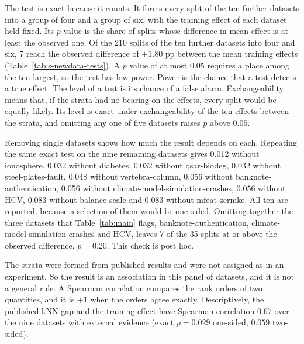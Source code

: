 The test is exact because it counts. It forms every split of the ten further datasets into a group of four and a group of six, with the training effect of each dataset held fixed. Its $p$ value is the share of splits whose difference in mean effect is at least the observed one. Of the 210 splits of the ten further datasets into four and six, 7 reach the observed difference of $+1.80$ pp between the mean training effects (Table~\ref{tab:s-newdata-tests}). A $p$ value of at most 0.05 requires a place among the ten largest, so the test has low power. Power is the chance that a test detects a true effect. The level of a test is its chance of a false alarm. Exchangeability means that, if the strata had no bearing on the effects, every split would be equally likely. Its level is exact under exchangeability of the ten effects between the strata, and omitting any one of five datasets raises $p$ above $0.05$.

Removing single datasets shows how much the result depends on each. Repeating the same exact test on the nine remaining datasets gives 0.012 without ionosphere, 0.032 without diabetes, 0.032 without qsar-biodeg, 0.032 without steel-plates-fault, 0.048 without vertebra-column, 0.056 without banknote-authentication, 0.056 without climate-model-simulation-crashes, 0.056 without HCV, 0.083 without balance-scale and 0.083 without mfeat-zernike. All ten are reported, because a selection of them would be one-sided. Omitting together the three datasets that Table~\ref{tab:main} flags, banknote-authentication, climate-model-simulation-crashes and HCV, leaves 7 of the 35 splits at or above the observed difference, $p=0.20$. This check is post hoc.

The strata were formed from published results and were not assigned as in an experiment. So the result is an association in this panel of datasets, and it is not a general rule. A Spearman correlation compares the rank orders of two quantities, and it is $+1$ when the orders agree exactly. Descriptively, the published kNN gap and the training effect have Spearman correlation $0.67$ over the nine datasets with external evidence (exact $p=0.029$ one-sided, $0.059$ two-sided).






